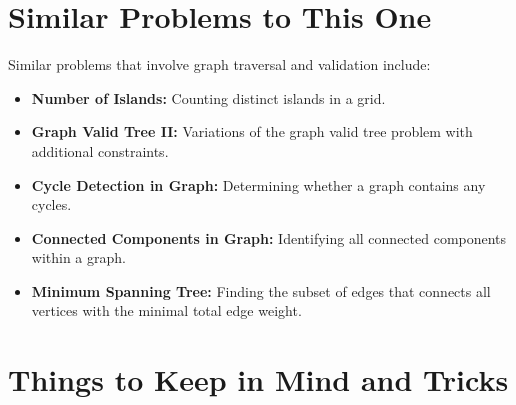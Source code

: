 \section*{Similar Problems to This One}

Similar problems that involve graph traversal and validation include:

\begin{itemize}
    \item \textbf{Number of Islands:} Counting distinct islands in a grid.
    
    \item \textbf{Graph Valid Tree II:} Variations of the graph valid tree problem with additional constraints.
    
    \item \textbf{Cycle Detection in Graph:} Determining whether a graph contains any cycles.
    
    \item \textbf{Connected Components in Graph:} Identifying all connected components within a graph.
    
    \item \textbf{Minimum Spanning Tree:} Finding the subset of edges that connects all vertices with the minimal total edge weight.
\end{itemize}

\section*{Things to Keep in Mind and Tricks}

